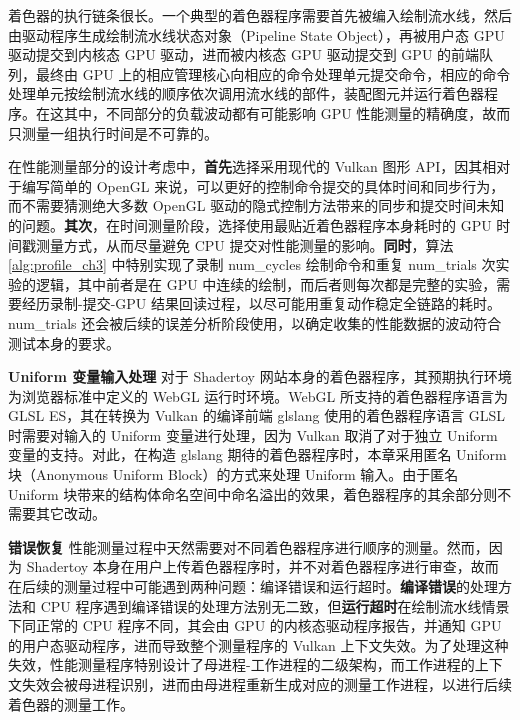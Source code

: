 { 着色器的执行链条很长。一个典型的着色器程序需要首先被编入绘制流水线，然后由驱动程序生成绘制流水线状态对象（Pipeline State Object），再被用户态 GPU 驱动提交到内核态 GPU 驱动，进而被内核态 GPU 驱动提交到 GPU 的前端队列，最终由 GPU 上的相应管理核心向相应的命令处理单元提交命令，相应的命令处理单元按绘制流水线的顺序依次调用流水线的部件，装配图元并运行着色器程序。在这其中，不同部分的负载波动都有可能影响 GPU 性能测量的精确度，故而只测量一组执行时间是不可靠的。

在性能测量部分的设计考虑中，{\bf 首先}选择采用现代的 Vulkan 图形 API，因其相对于编写简单的 OpenGL 来说，可以更好的控制命令提交的具体时间和同步行为，而不需要猜测绝大多数 OpenGL 驱动的隐式控制方法带来的同步和提交时间未知的问题。{\bf 其次}，在时间测量阶段，选择使用最贴近着色器程序本身耗时的 GPU 时间戳测量方式，从而尽量避免 CPU 提交对性能测量的影响。{\bf 同时}，算法 \ref{alg:profile_ch3} 中特别实现了录制 {num\_cycles} 绘制命令和重复 {num\_trials} 次实验的逻辑，其中前者是在 GPU 中连续的绘制，而后者则每次都是完整的实验，需要经历录制-提交-GPU 结果回读过程，以尽可能用重复动作稳定全链路的耗时。{num\_trials} 还会被后续的误差分析阶段使用，以确定收集的性能数据的波动符合测试本身的要求。

{\bf Uniform 变量输入处理} 对于 Shadertoy 网站本身的着色器程序，其预期执行环境为浏览器标准中定义的 WebGL 运行时环境\cite{WebGL}。WebGL 所支持的着色器程序语言为 GLSL ES，其在转换为 Vulkan 的编译前端 glslang 使用的着色器程序语言 GLSL 时需要对输入的 Uniform 变量进行处理，因为 Vulkan 取消了对于独立 Uniform 变量的支持。对此，在构造 glslang 期待的着色器程序时，本章采用匿名 Uniform 块（Anonymous Uniform Block）的方式来处理 Uniform 输入。由于匿名 Uniform 块带来的结构体命名空间中命名溢出的效果，着色器程序的其余部分则不需要其它改动。

{\bf 错误恢复} 性能测量过程中天然需要对不同着色器程序进行顺序的测量。然而，因为 Shadertoy 本身在用户上传着色器程序时，并不对着色器程序进行审查，故而在后续的测量过程中可能遇到两种问题：编译错误和运行超时。{\bf 编译错误}的处理方法和 CPU 程序遇到编译错误的处理方法别无二致，但{\bf 运行超时}在绘制流水线情景下同正常的 CPU 程序不同，其会由 GPU 的内核态驱动程序报告，并通知 GPU 的用户态驱动程序，进而导致整个测量程序的 Vulkan 上下文失效。为了处理这种失效，性能测量程序特别设计了母进程-工作进程的二级架构，而工作进程的上下文失效会被母进程识别，进而由母进程重新生成对应的测量工作进程，以进行后续着色器的测量工作。

}

